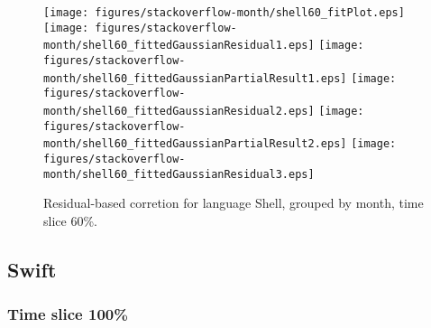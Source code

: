 \begin{figure}[hb]
\centering
{}
{\texttt{[image: figures/stackoverflow-month/shell60\_fitPlot.eps]}}
{\texttt{[image: figures/stackoverflow-month/shell60\_fittedGaussianResidual1.eps]}}
{\texttt{[image: figures/stackoverflow-month/shell60\_fittedGaussianPartialResult1.eps]}}
{\texttt{[image: figures/stackoverflow-month/shell60\_fittedGaussianResidual2.eps]}}
{\texttt{[image: figures/stackoverflow-month/shell60\_fittedGaussianPartialResult2.eps]}}
{\texttt{[image: figures/stackoverflow-month/shell60\_fittedGaussianResidual3.eps]}}
\caption{Residual-based corretion for language Shell, grouped by month, time slice 60\%.}
\end{figure}


\clearpage 
\newpage 


\subsection{Swift}

\FloatBarrier

\subsubsection{Time slice 100\%}

